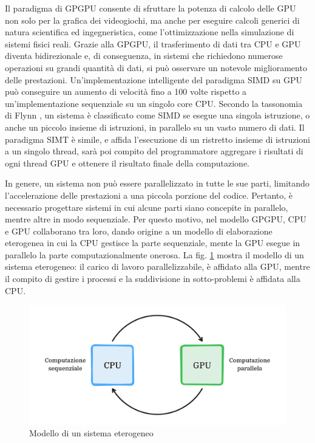 Il paradigma di GPGPU consente di sfruttare la potenza di calcolo delle GPU non solo per la grafica dei videogiochi, ma anche per eseguire calcoli generici di natura scientifica ed ingegneristica, come l'ottimizzazione nella simulazione di sistemi fisici reali. Grazie alla GPGPU, il trasferimento di dati tra CPU e GPU diventa bidirezionale e, di conseguenza, in sistemi che richiedono numerose operazioni su grandi quantità di dati, si può osservare un notevole miglioramento delle prestazioni. Un'implementazione intelligente del paradigma SIMD su GPU può conseguire un aumento di velocità fino a 100 volte rispetto a un'implementazione sequenziale su un singolo core CPU. Secondo la tassonomia di Flynn \cite[]{Flynn:tax}, un sistema è classificato come SIMD se esegue una singola istruzione, o anche un piccolo insieme di istruzioni, in parallelo su un vasto numero di dati. Il paradigma SIMT è simile, e affida l'esecuzione di un ristretto insieme di istruzioni a un singolo thread, sarà poi compito del programmatore aggregare i risultati di ogni thread GPU e ottenere il risultato finale della computazione.

In genere, un sistema non può essere parallelizzato in tutte le sue parti, limitando l'accelerazione delle prestazioni a una piccola porzione del codice. Pertanto, è necessario progettare sistemi in cui alcune parti siano concepite in parallelo, mentre altre in modo sequenziale. Per questo motivo, nel modello GPGPU, CPU e GPU collaborano tra loro, dando origine a un modello di elaborazione eterogenea in cui la CPU gestisce la parte sequenziale, mente la GPU esegue in parallelo la parte computazionalmente onerosa.
La fig. \ref{fig:het_model} mostra il modello di un sistema eterogeneo: il carico di lavoro parallelizzabile, è affidato alla GPU, mentre il compito di gestire i processi e la suddivisione in sotto-problemi è affidata alla CPU.

\begin{figure}[ht]
    \centering
    \includegraphics[width=.9\linewidth]{images/chapter2/het_model2.png}
    \caption{Modello di un sistema eterogeneo}
    \label{fig:het_model}
\end{figure}


